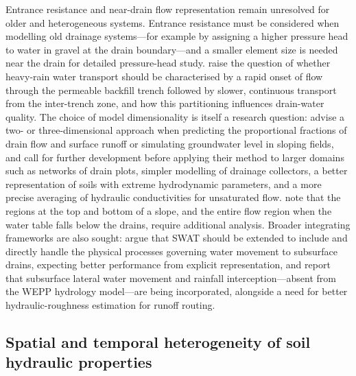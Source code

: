Entrance resistance and near-drain flow representation remain unresolved for
older and heterogeneous systems. Entrance
resistance must be considered when modelling old drainage systems---for
example by assigning a higher pressure head to water in gravel at the drain
boundary---and a smaller element size is needed near the drain for
detailed pressure-head study. \textcite{Messing2006} raise the question of
whether heavy-rain water transport should be characterised by a rapid onset of
flow through the permeable backfill trench followed by slower, continuous
transport from the inter-trench zone, and how this partitioning influences
drain-water quality. The choice of model dimensionality is itself a research
question: \textcite{Alakukku2010} advise a two- or three-dimensional approach
when predicting the proportional fractions of drain flow and surface runoff or
simulating groundwater level in sloping fields, and \textcite{Carlier2007}
call for further development before applying their method to larger domains
such as networks of drain plots, simpler modelling of drainage collectors, a
better representation of soils with extreme hydrodynamic parameters, and a more
precise averaging of hydraulic conductivities for unsaturated flow.
\textcite{FIPPS1989} note that the regions at the top and bottom of a slope,
and the entire flow region when the water table falls below the drains, require
additional analysis. Broader integrating frameworks are also sought:
\textcite{Manguerra1998} argue that SWAT should be extended to include and
directly handle the physical processes governing water movement to subsurface
drains, expecting better performance from explicit representation, and
\textcite{SAVABI1993} report that subsurface lateral water movement and
rainfall interception---absent from the WEPP hydrology model---are being
incorporated, alongside a need for better hydraulic-roughness estimation for
runoff routing.

\subsection{Spatial and temporal heterogeneity of soil hydraulic properties}

